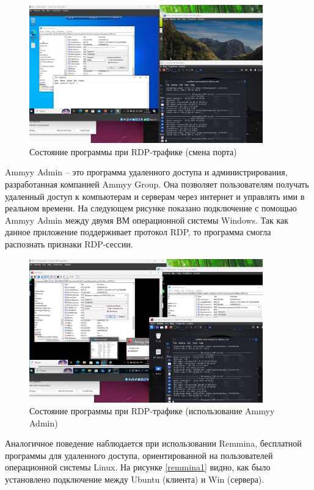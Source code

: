 \documentclass[bachelor, och, coursework]{SCWorks}
\begin{document}
\begin{figure}[H]
  \centering
  \includegraphics[width=0.9\textwidth]{pics/8rdp.png}
  \caption{Состояние программы при RDP-трафике (смена порта)}
  \label{rdp2}
\end{figure}

Ammyy Admin -- это программа удаленного доступа и администрирования, разработанная компанией Ammyy Group. Она 
позволяет пользователям получать удаленный доступ к компьютерам и серверам через интернет и управлять ими 
в реальном времени. На следующем рисунке показано подключение с помощью Ammyy Admin между двумя ВМ операционной системы Windows. 
Так как данное приложение поддерживает протокол RDP, то программа смогла распознать признаки RDP-сессии.


\begin{figure}[H]
  \centering
  \includegraphics[width=0.9\textwidth]{pics/9ammyy.png}
  \caption{Состояние программы при RDP-трафике (использование Ammyy Admin)}
  \label{ammyy1}
\end{figure}

Аналогичное поведение наблюдается при использовании Remmina, бесплатной программы для удаленного доступа, ориентированной 
на пользователей операционной системы Linux. На рисунке \ref{remmina1} видно, как было установлено подключение между Ubuntu (клиента) и Win (сервера).  
\end{document}
